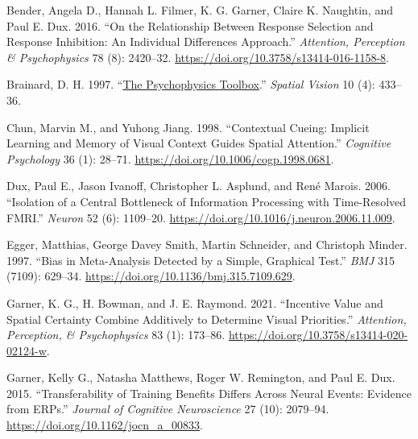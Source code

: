 \documentclass{article}
\newlength{\cslhangindent}
\newlength{\cslentryspacingunit} %
\newenvironment{CSLReferences}[2] %
 {%
  \setlength{\parindent}{0pt}
  \ifodd #1
  \let\oldpar\par
  \def\par{\hangindent=\cslhangindent\oldpar}
  \fi
  \setlength{\parskip}{#2\cslentryspacingunit}
 }%
 {}
\begin{document}
\hypertarget{refs}{}
\begin{CSLReferences}{1}{0}
\leavevmode{}%
Bender, Angela D., Hannah L. Filmer, K. G. Garner, Claire K. Naughtin, and Paul E. Dux. 2016. {``On the Relationship Between Response Selection and Response Inhibition: {An} Individual Differences Approach.''} \emph{Attention, Perception \& Psychophysics} 78 (8): 2420--32. \url{https://doi.org/10.3758/s13414-016-1158-8}.

\leavevmode{}%
Brainard, D. H. 1997. {``\href{https://www.ncbi.nlm.nih.gov/pubmed/9176952}{The {Psychophysics} {Toolbox}}.''} \emph{Spatial Vision} 10 (4): 433--36.

\leavevmode{}%
Chun, Marvin M., and Yuhong Jiang. 1998. {``Contextual Cueing: {Implicit} Learning and Memory of Visual Context Guides Spatial Attention.''} \emph{Cognitive Psychology} 36 (1): 28--71. \url{https://doi.org/10.1006/cogp.1998.0681}.

\leavevmode{}%
Dux, Paul E., Jason Ivanoff, Christopher L. Asplund, and René Marois. 2006. {``Isolation of a Central Bottleneck of Information Processing with Time-Resolved {FMRI}.''} \emph{Neuron} 52 (6): 1109--20. \url{https://doi.org/10.1016/j.neuron.2006.11.009}.

\leavevmode{}%
Egger, Matthias, George Davey Smith, Martin Schneider, and Christoph Minder. 1997. {``Bias in Meta-Analysis Detected by a Simple, Graphical Test.''} \emph{BMJ} 315 (7109): 629--34. \url{https://doi.org/10.1136/bmj.315.7109.629}.

\leavevmode{}%
Garner, K. G., H. Bowman, and J. E. Raymond. 2021. {``Incentive Value and Spatial Certainty Combine Additively to Determine Visual Priorities.''} \emph{Attention, Perception, \& Psychophysics} 83 (1): 173--86. \url{https://doi.org/10.3758/s13414-020-02124-w}.

\leavevmode{}%
Garner, Kelly G., Natasha Matthews, Roger W. Remington, and Paul E. Dux. 2015. {``Transferability of {Training} {Benefits} {Differs} Across {Neural} {Events}: {Evidence} from {ERPs}.''} \emph{Journal of Cognitive Neuroscience} 27 (10): 2079--94. \url{https://doi.org/10.1162/jocn_a_00833}.


\end{CSLReferences}
\end{document}
